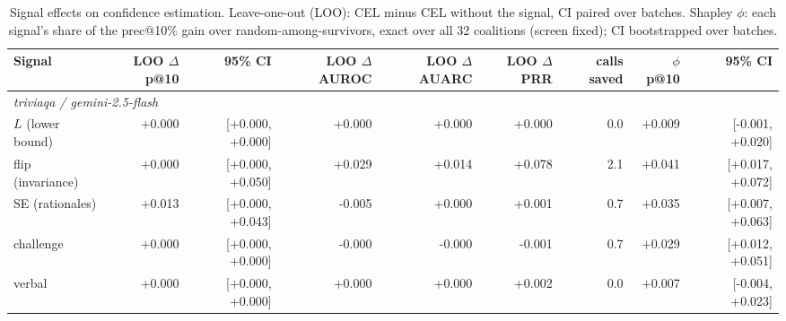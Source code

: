\begin{table}[t]
\centering
\small
\begin{tabular}{lrrrrrrrr}
\toprule
Signal & LOO $\Delta$p@10 & 95\% CI & LOO $\Delta$AUROC & LOO $\Delta$AUARC & LOO $\Delta$PRR & calls saved & $\phi$ p@10 & 95\% CI \\
\midrule
\multicolumn{9}{l}{\emph{triviaqa / gemini-2.5-flash}} \\
$L$ (lower bound) & +0.000 & [+0.000, +0.000] & +0.000 & +0.000 & +0.000 & 0.0 & +0.009 & [-0.001, +0.020] \\
flip (invariance) & +0.000 & [+0.000, +0.050] & +0.029 & +0.014 & +0.078 & 2.1 & +0.041 & [+0.017, +0.072] \\
SE (rationales) & +0.013 & [+0.000, +0.043] & -0.005 & +0.000 & +0.001 & 0.7 & +0.035 & [+0.007, +0.063] \\
challenge & +0.000 & [+0.000, +0.000] & -0.000 & -0.000 & -0.001 & 0.7 & +0.029 & [+0.012, +0.051] \\
verbal & +0.000 & [+0.000, +0.000] & +0.000 & +0.000 & +0.002 & 0.0 & +0.007 & [-0.004, +0.023] \\
\bottomrule
\end{tabular}
\caption{Signal effects on confidence estimation. Leave-one-out (LOO): CEL minus CEL without the signal, CI paired over batches. Shapley $\phi$: each signal's share of the prec@10\% gain over random-among-survivors, exact over all 32 coalitions (screen fixed); CI bootstrapped over batches.}
\label{tab:signal_effects}
\end{table}
